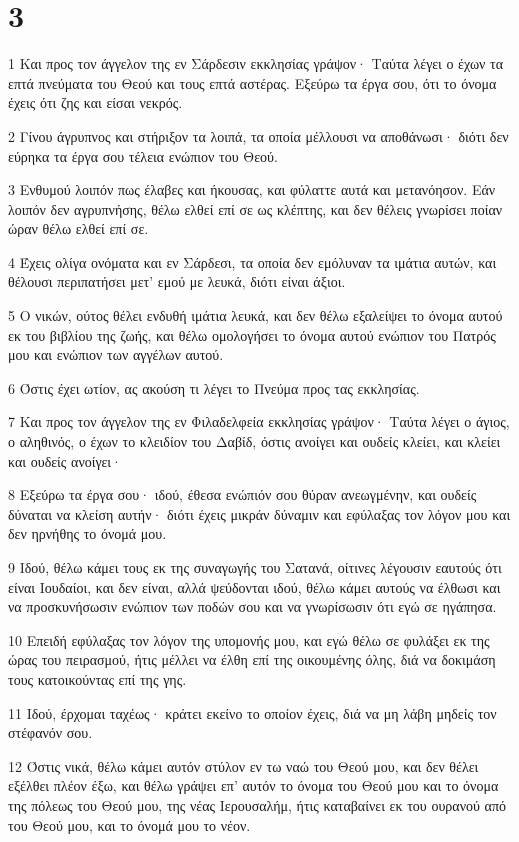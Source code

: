 \chapter{3}

\par 1 Και προς τον άγγελον της εν Σάρδεσιν εκκλησίας γράψον· Ταύτα λέγει ο έχων τα επτά πνεύματα του Θεού και τους επτά αστέρας. Εξεύρω τα έργα σου, ότι το όνομα έχεις ότι ζης και είσαι νεκρός.
\par 2 Γίνου άγρυπνος και στήριξον τα λοιπά, τα οποία μέλλουσι να αποθάνωσι· διότι δεν εύρηκα τα έργα σου τέλεια ενώπιον του Θεού.
\par 3 Ενθυμού λοιπόν πως έλαβες και ήκουσας, και φύλαττε αυτά και μετανόησον. Εάν λοιπόν δεν αγρυπνήσης, θέλω ελθεί επί σε ως κλέπτης, και δεν θέλεις γνωρίσει ποίαν ώραν θέλω ελθεί επί σε.
\par 4 Έχεις ολίγα ονόματα και εν Σάρδεσι, τα οποία δεν εμόλυναν τα ιμάτια αυτών, και θέλουσι περιπατήσει μετ' εμού με λευκά, διότι είναι άξιοι.
\par 5 Ο νικών, ούτος θέλει ενδυθή ιμάτια λευκά, και δεν θέλω εξαλείψει το όνομα αυτού εκ του βιβλίου της ζωής, και θέλω ομολογήσει το όνομα αυτού ενώπιον του Πατρός μου και ενώπιον των αγγέλων αυτού.
\par 6 Όστις έχει ωτίον, ας ακούση τι λέγει το Πνεύμα προς τας εκκλησίας.
\par 7 Και προς τον άγγελον της εν Φιλαδελφεία εκκλησίας γράψον· Ταύτα λέγει ο άγιος, ο αληθινός, ο έχων το κλειδίον του Δαβίδ, όστις ανοίγει και ουδείς κλείει, και κλείει και ουδείς ανοίγει·
\par 8 Εξεύρω τα έργα σου· ιδού, έθεσα ενώπιόν σου θύραν ανεωγμένην, και ουδείς δύναται να κλείση αυτήν· διότι έχεις μικράν δύναμιν και εφύλαξας τον λόγον μου και δεν ηρνήθης το όνομά μου.
\par 9 Ιδού, θέλω κάμει τους εκ της συναγωγής του Σατανά, οίτινες λέγουσιν εαυτούς ότι είναι Ιουδαίοι, και δεν είναι, αλλά ψεύδονται ιδού, θέλω κάμει αυτούς να έλθωσι και να προσκυνήσωσιν ενώπιον των ποδών σου και να γνωρίσωσιν ότι εγώ σε ηγάπησα.
\par 10 Επειδή εφύλαξας τον λόγον της υπομονής μου, και εγώ θέλω σε φυλάξει εκ της ώρας του πειρασμού, ήτις μέλλει να έλθη επί της οικουμένης όλης, διά να δοκιμάση τους κατοικούντας επί της γης.
\par 11 Ιδού, έρχομαι ταχέως· κράτει εκείνο το οποίον έχεις, διά να μη λάβη μηδείς τον στέφανόν σου.
\par 12 Όστις νικά, θέλω κάμει αυτόν στύλον εν τω ναώ του Θεού μου, και δεν θέλει εξέλθει πλέον έξω, και θέλω γράψει επ' αυτόν το όνομα του Θεού μου και το όνομα της πόλεως του Θεού μου, της νέας Ιερουσαλήμ, ήτις καταβαίνει εκ του ουρανού από του Θεού μου, και το όνομά μου το νέον.
